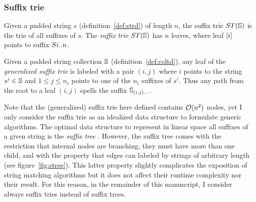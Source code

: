 \subsubsection{Suffix trie}

\begin{definition}
Given a padded string $s$ (definition~\ref{def:strd}) of length $n$, the suffix trie $ST(\mathbb{S})$ is the trie of all suffixes of $s$.
The \emph{suffix trie} $ST(\mathbb{S})$ has $n$ leaves, where leaf $[i]$ points to suffix $S{i..n}$.
\end{definition}
\begin{definition}
Given a padded string collection $\mathbb{S}$ (definition~\ref{def:coltd}), any leaf of the \emph{generalized suffix trie} is labeled with a pair $(i,j)$ where $i$ points to the string $s^i \in \mathbb{S}$ and $1 \leq j \leq n_i$ points to one of the $n_i$ suffixes of $s^i$.
Thus any path from the root to a leaf $(i,j)$ spells the suffix $\mathbb{S}_{(i,j) \dots}$.
\end{definition}

\begin{figure}[b]
\caption[Example of suffix trie and suffix tree]{Suffix trie and suffix tree of the string {\ttfamily ANANAS\$} .}
\label{fig:stree}
\begin{subfigure}{.5\textwidth}
\begin{center}

\end{center}
\end{subfigure}%
\begin{subfigure}{.5\textwidth}
\begin{center}

\end{center}
\end{subfigure}
\end{figure}

Note that the (generalized) suffix trie here defined contains $\mathcal{O}(n^2)$ nodes, yet I only consider the suffix trie as an idealized data structure to formulate generic algorithms.
The optimal data structure to represent in linear space all suffixes of a given string is the \emph{suffix tree} \citep{Morrison1968}.
However, the suffix tree comes with the restriction that internal nodes are branching, \ie they must have more than one child, and with the property that edges can labeled by strings of arbitrary length (see figure~\ref{fig:stree}).
This latter property slightly complicates the exposition of string matching algorithms but it does not affect their runtime complexity nor their result.
For this reason, in the remainder of this manuscript, I consider \wlogs always suffix tries instead of suffix trees.

